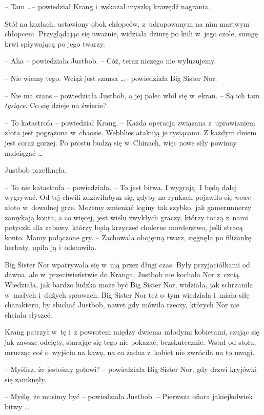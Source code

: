 \documentclass[oneside,polish,11pt,rmheadings]{mwbk}
\begin{document}
-- Tam \ldots  -- powiedział Krang i~wskazał myszką krawędź nagrania. 

Stół na kozłach, ustawiony obok chłopców, z~udrapowanym na nim martwym chłopcem. Przyglądając się uważnie, widziała dziurę po kuli w~jego czole, smugę krwi spływającą po jego twarzy.

-- Aha -- powiedziała Justbob. -- Cóż, teraz niczego nie wyluzujemy.

-- Nie wiemy tego. Wciąż jest szansa \ldots -- powiedziała Big Sister Nor.

-- Nie ma szans -- powiedziała Justbob, a jej palec wbił się w~ekran. -- Są ich tam \textit{tysiące}. Co się dzieje na świecie?

-- To katastrofa -- powiedział Krang. -- Każda operacja związana z~uprawianiem złota jest pogrążona w~chaosie. Webblies atakują je tysiącami. Z każdym dniem jest coraz gorzej. Po prostu budzą się w~Chinach, więc nowe siły powinny nadciągać \ldots 

Justbob przełknęła. 

-- To nie katastrofa -- powiedziała. -- To jest bitwa. I wygrają. I będą dalej wygrywać. Od tej chwili zdziwiłabym się, gdyby na rynkach pojawiło się \textit{nowe }złoto w~dowolnej grze. Możemy zmieniać loginy tak szybko, jak gamerunnerzy zamykają konta, a co więcej, jest wielu zwykłych graczy, którzy toczą z~nami potyczki dla zabawy, którzy będą krzyczeć cholerne morderstwo, jeśli stracą konto. Mamy połączone gry. -- Zachowała obojętną twarz, sięgnęła po filiżankę herbaty, upiła ją i~odstawiła.

Big Sister Nor wpatrywała się w~nią przez długi czas. Były przyjaciółkami od dawna, ale w~przeciwieństwie do Kranga, Justbob nie kochała Nor z~czcią. Wiedziała, jak bardzo ludzka może być Big Sister Nor, widziała, jak schrzaniła w~małych i~dużych sprawach. Big Sister Nor też o~tym wiedziała i~miała siłę charakteru, by słuchać Justbob, nawet gdy mówiła rzeczy, których Nor nie chciała słyszeć.

Krang patrzył w~tę i~z powrotem między dwiema młodymi kobietami, czując się jak zawsze odcięty, starając się tego nie pokazać, bezskutecznie. Wstał od stołu, mrucząc coś o~wyjściu na kawę, na co żadna z~kobiet nie zwróciła na to uwagi.

-- Myślisz, że jesteśmy gotowi? -- powiedziała Big Sister Nor, gdy drzwi kryjówki się zamknęły.

-- Myślę, że musimy być -- powiedziała Justbob. -- Pierwsza ofiara jakiejkolwiek bitwy \ldots  
\end{document}

